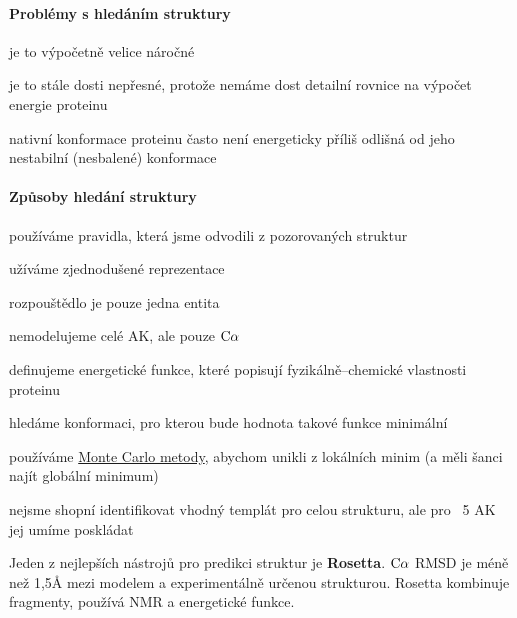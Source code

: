 \documentclass[DIV=8]{scrreprt}
\begin{document}
\paragraph{Problémy s hledáním struktury}
\begin{myItemize}[nosep]
    \item je to výpočetně velice náročné
    \item je to stále dosti nepřesné, protože nemáme dost detailní rovnice na výpočet energie proteinu
    \item nativní konformace proteinu často není energeticky příliš odlišná od jeho nestabilní (nesbalené) konformace
\end{myItemize}



\paragraph{Způsoby hledání struktury}
\begin{myItemize}[nosep]
    \item používáme pravidla, která jsme odvodili z pozorovaných struktur
    \item užíváme zjednodušené reprezentace
\begin{myItemize}[nosep]
    \item rozpouštědlo je pouze jedna entita
    \item nemodelujeme celé AK, ale pouze \(\ce{C\alpha}\)
\end{myItemize}

    \item definujeme energetické funkce, které popisují fyzikálně--chemické vlastnosti proteinu
    \item hledáme konformaci, pro kterou bude hodnota takové funkce minimální
\begin{myItemize}[nosep]
    \item používáme \href{https://cs.wikipedia.org/wiki/Metoda_Monte_Carlo}{Monte Carlo metody}, abychom unikli z lokálních minim (a měli šanci najít globální minimum)
    \item nejsme shopní identifikovat vhodný templát pro celou strukturu, ale pro ~5 AK jej umíme poskládat
\end{myItemize}

\end{myItemize}



Jeden z nejlepších nástrojů pro predikci struktur je \textbf{Rosetta}. \(\ce{C\alpha}\) RMSD je méně než 1,5Å mezi modelem a experimentálně určenou strukturou. Rosetta kombinuje fragmenty, používá NMR a energetické funkce.
\end{document}
